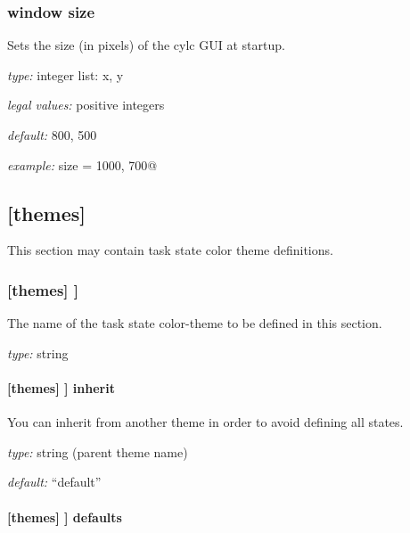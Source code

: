 \subsubsection{window size}

Sets the size (in pixels) of the cylc GUI at startup.

\begin{myitemize}
    \item {\em type:} integer list: x, y
    \item {\em legal values:} positive integers
    \item {\em default:} 800, 500
    \item {\em example:} \lstinline@window size = 1000, 700@
\end{myitemize}


\subsection{[themes]}

This section may contain task state color theme definitions.

\subsubsection[{[}THEME{]}]{[themes] \textrightarrow [[THEME]]}

The name of the task state color-theme to be defined in this section.

\begin{myitemize}
\item {\em type:} string
\end{myitemize}

\paragraph[inherit]{[themes] \textrightarrow [[THEME]] \textrightarrow inherit}

You can inherit from another theme in order to avoid defining all states.

\begin{myitemize}
\item {\em type:} string (parent theme name)
\item {\em default:} ``default''
\end{myitemize}

\paragraph[defaults]{[themes] \textrightarrow [[THEME]] \textrightarrow defaults}

